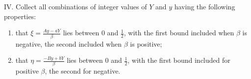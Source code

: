 IV. Collect all combinations of integer values of $Y$ and $y$ having the following properties:
\begin{enumerate}
\item that $\xi=\frac{Ay-aY}{\beta}$ lies between $0$ and $\frac12$, with the first bound included when $\beta$ is negative, the second included when $\beta$ is positive;
\item that $\eta=\frac{-By+bY}{\beta}$ lies between $0$ and $\frac12$, with the first bound included for positive $\beta$, the second for negative.
\end{enumerate}
